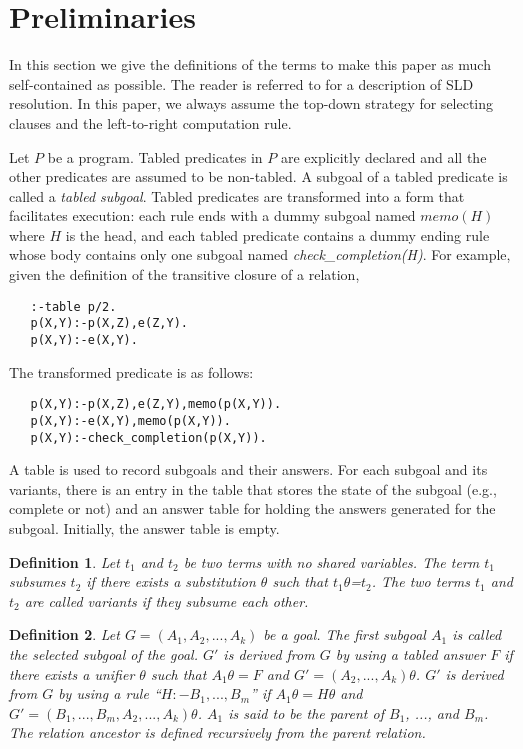 \documentclass{tlp}
\newtheorem{definition}{Definition} \newtheorem{example}{Example} \newcommand{\pivot}[1]{\mathbin{\, {#1} \,}}
\begin{document}
\section{Preliminaries}
In this section we give the definitions of the terms to make this paper as much self-contained as possible. The reader is referred to \cite{Lloyd88} for a description of SLD resolution. In this paper, we always assume the top-down strategy for selecting clauses and the left-to-right computation rule.

Let $P$ be a program. Tabled predicates in $P$ are explicitly declared and all the other predicates are assumed to be non-tabled. A subgoal of a tabled predicate is called a {\it tabled subgoal}. Tabled predicates are transformed into a form that facilitates execution: each rule ends with a dummy subgoal named $memo(H)$ where $H$ is the head, and each tabled predicate contains a dummy ending rule whose body contains only one subgoal named {\it check\_completion(H)}. For example, given the definition of the transitive closure of a relation,
\begin{verbatim}
   :-table p/2.
   p(X,Y):-p(X,Z),e(Z,Y).
   p(X,Y):-e(X,Y).
\end{verbatim}
The transformed predicate is as follows:
\begin{verbatim}
   p(X,Y):-p(X,Z),e(Z,Y),memo(p(X,Y)). 
   p(X,Y):-e(X,Y),memo(p(X,Y)).               
   p(X,Y):-check_completion(p(X,Y)).          
\end{verbatim}

A table is used to record subgoals and their answers. For each subgoal and its variants, there is an entry in the table that stores the state of the subgoal (e.g., complete or not) and an answer table for holding the answers generated for the subgoal. Initially, the answer table is empty. 

\begin{definition} Let $t_1$ and $t_2$ be two terms with no shared variables. The term $t_1$ {\it subsumes} $t_2$ if there exists a substitution $\theta$ such that $t_1\theta$=$t_2$. The two terms $t_1$ and $t_2$ are called {\it variants} if they subsume each other. 
\end{definition}

\begin{definition} Let $G=(A_1,A_2,...,A_k)$ be a goal. The first subgoal $A_1$ is called the {\it selected subgoal} of the goal. $G'$ is {\it derived} from $G$ by using a tabled {\it answer} $F$ if there exists a unifier $\theta$ such that $A_1\theta=F$ and $G'=(A_2,...,A_k)\theta$. $G'$ is {\it derived} from $G$ by using a rule ``$H:-B_1,...,B_m$'' if $A_1\theta=H\theta$ and $G'=(B_1,...,B_m,A_2,...,A_k)\theta$. $A_1$ is said to be the {\it parent} of $B_1$, ..., and $B_m$. The relation {\it ancestor} is defined recursively from the parent relation.
\end{definition}
\end{document}
